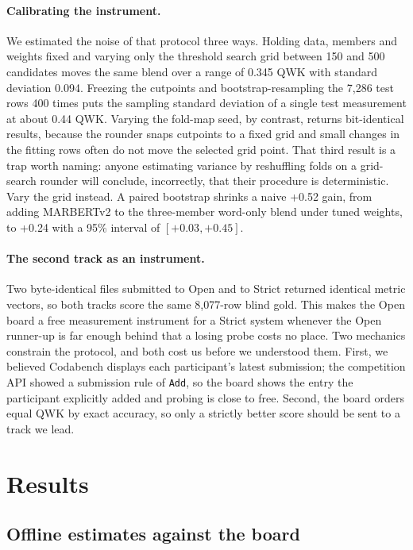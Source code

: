 \documentclass[11pt]{article}
\begin{document}
\paragraph{Calibrating the instrument.} We estimated the noise of that protocol three ways.
Holding data, members and weights fixed and varying only the threshold search grid between
150 and 500 candidates moves the same blend over a range of 0.345 QWK with standard
deviation 0.094. Freezing the cutpoints and bootstrap-resampling the 7,286 test rows 400
times puts the sampling standard deviation of a single test measurement at about 0.44 QWK.
Varying the fold-map seed, by contrast, returns bit-identical results, because the rounder
snaps cutpoints to a fixed grid and small changes in the fitting rows often do not move the
selected grid point. That third result is a trap worth naming: anyone estimating variance by
reshuffling folds on a grid-search rounder will conclude, incorrectly, that their procedure is
deterministic. Vary the grid instead. A paired bootstrap shrinks a naive +0.52 gain, from
adding MARBERTv2 to the three-member word-only blend under tuned weights, to +0.24 with a
95\% interval of $[+0.03, +0.45]$.

\paragraph{The second track as an instrument.} Two byte-identical files submitted to Open
and to Strict returned identical metric vectors, so both tracks score the same 8,077-row
blind gold. This makes the Open board a free measurement instrument for a Strict system
whenever the Open runner-up is far enough behind that a losing probe costs no place. Two
mechanics constrain the protocol, and both cost us before we understood them. First, we
believed Codabench displays each participant's latest submission; the competition API showed a
submission rule of \texttt{Add}, so the board shows the entry the participant explicitly added
and probing is close to free. Second, the board orders equal QWK by exact accuracy, so only a
strictly better score should be sent to a track we lead.

\section{Results}
\label{sec:results}

\subsection{Offline estimates against the board}
\end{document}
